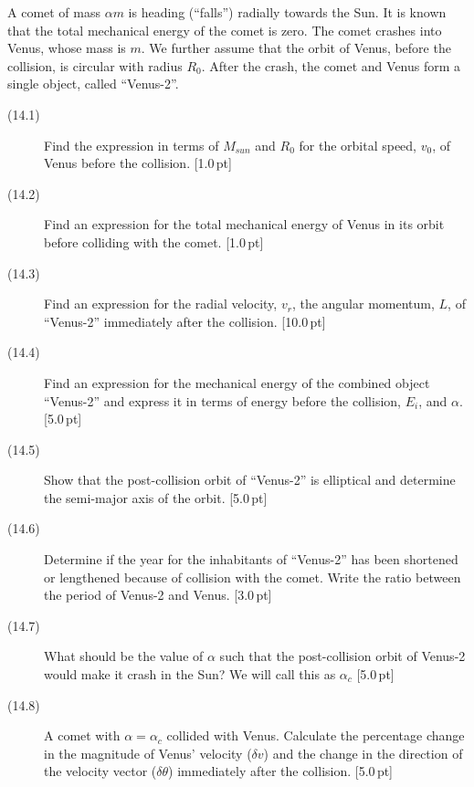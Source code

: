 A comet of mass $\alpha m$ is heading (``falls'') radially towards the Sun. It
is known that the total mechanical energy of the comet is zero. The comet
crashes into Venus, whose mass is $m$. We further assume that the orbit of
Venus, before the collision, is circular with radius $R_0$. After the crash,
the comet and Venus form a single object, called ``Venus-2''.


\begin{description}
\item[(14.1)] Find the expression in terms of $M_{sun}$ and $R_0$ for the
  orbital speed, $v_0$, of Venus before the collision. \hfill[1.0\,pt]
\item[(14.2)] Find an expression for the total mechanical energy of Venus in
  its orbit before colliding with the comet. \hfill[1.0\,pt]
\item[(14.3)] Find an expression for the radial velocity, $v_r$, the angular
  momentum, $L$, of ``Venus-2'' immediately after the collision.
  \hfill[10.0\,pt]
\item[(14.4)] Find an expression for the mechanical energy of the combined
  object ``Venus-2'' and express it in terms of energy before the collision,
  $E_i$, and $\alpha$. \hfill[5.0\,pt]
\item[(14.5)] Show that the post-collision orbit of ``Venus-2'' is elliptical
  and determine the semi-major axis of the orbit. \hfill[5.0\,pt]
\item[(14.6)] Determine if the year for the inhabitants of ``Venus-2'' has
  been shortened or lengthened because of collision with the comet. Write the
  ratio between the period of Venus-2 and Venus. \hfill[3.0\,pt]
\item[(14.7)] What should be the value of $\alpha$ such that the
  post-collision orbit of Venus-2 would make it crash in the Sun? We will call
  this as $\alpha_c$ \hfill[5.0\,pt]
\item[(14.8)] A comet with $\alpha = \alpha_c$ collided with Venus. Calculate
  the percentage change in the magnitude of Venus' velocity ($\delta v$) and
  the change in the direction of the velocity vector ($\delta\theta$)
  immediately after the collision. \hfill[5.0\,pt]
\end{description}
